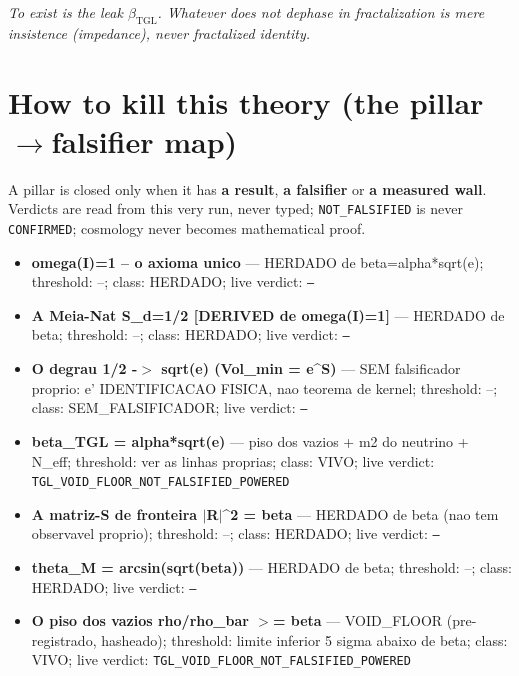 \documentclass[11pt]{article}
\newcommand{\bTGL}{\beta_{\mathrm{TGL}}}\newcommand{\Msun}{M_{\odot}}\newcommand{\TGL}{\mathrm{TGL}}
\theoremstyle{definition}\newtheorem{deriv}{Derivation}
\begin{document}
\emph{To exist is the leak $\bTGL$. Whatever does not dephase in fractalization is mere insistence (impedance), never fractalized identity.}

\section{How to kill this theory (the pillar$\to$falsifier map)}

A pillar is closed only when it has \textbf{a result}, \textbf{a falsifier} or \textbf{a measured wall}. Verdicts are read from this very run, never typed; \texttt{NOT\_FALSIFIED} is never \texttt{CONFIRMED}; cosmology never becomes mathematical proof.

\begin{itemize}

\item \textbf{omega(I)=1 -- o axioma unico} --- HERDADO de beta=alpha*sqrt(e); threshold: --; class: HERDADO; live verdict: \texttt{--}

\item \textbf{A Meia-Nat S\_d=1/2 [DERIVED de omega(I)=1]} --- HERDADO de beta; threshold: --; class: HERDADO; live verdict: \texttt{--}

\item \textbf{O degrau 1/2 -$>$ sqrt(e)  (Vol\_min = e\^{}S)} --- SEM falsificador proprio: e' IDENTIFICACAO FISICA, nao teorema de kernel; threshold: --; class: SEM\_FALSIFICADOR; live verdict: \texttt{--}

\item \textbf{beta\_TGL = alpha*sqrt(e)} --- piso dos vazios + m2 do neutrino + N\_eff; threshold: ver as linhas proprias; class: VIVO; live verdict: \texttt{TGL\_VOID\_FLOOR\_NOT\_FALSIFIED\_POWERED}

\item \textbf{A matriz-S de fronteira $|$R$|$\^{}2 = beta} --- HERDADO de beta (nao tem observavel proprio); threshold: --; class: HERDADO; live verdict: \texttt{--}

\item \textbf{theta\_M = arcsin(sqrt(beta))} --- HERDADO de beta; threshold: --; class: HERDADO; live verdict: \texttt{--}

\item \textbf{O piso dos vazios rho/rho\_bar $>$= beta} --- VOID\_FLOOR (pre-registrado, hasheado); threshold: limite inferior 5 sigma abaixo de beta; class: VIVO; live verdict: \texttt{TGL\_VOID\_FLOOR\_NOT\_FALSIFIED\_POWERED}


\end{itemize}
\end{document}

